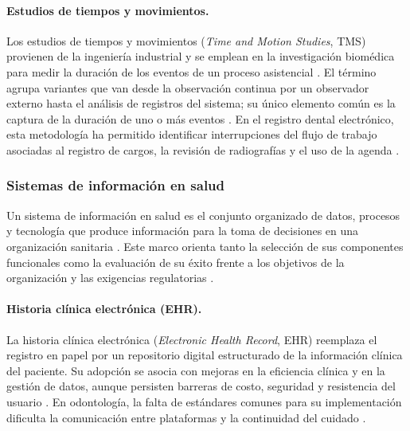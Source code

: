 \paragraph{Estudios de tiempos y movimientos.}

Los estudios de tiempos y movimientos (\textit{Time and Motion Studies}, TMS)
provienen de la ingeniería industrial y se emplean en la investigación biomédica para
medir la duración de los eventos de un proceso asistencial \cite{cureus2022purpose}.
El término agrupa variantes que van desde la observación continua por un observador
externo hasta el análisis de registros del sistema; su único elemento común es la
captura de la duración de uno o más eventos \cite{Lopetegui2014TMS}. En el registro
dental electrónico, esta metodología ha permitido identificar interrupciones del flujo
de trabajo asociadas al registro de cargos, la revisión de radiografías y el uso de la
agenda \cite{schwei2016exploring}.

\subsubsection{Sistemas de información en salud}

Un sistema de información en salud es el conjunto organizado de datos, procesos y
tecnología que produce información para la toma de decisiones en una organización
sanitaria \cite{sciencedirect2024his}. Este marco orienta tanto la selección de sus
componentes funcionales como la evaluación de su éxito frente a los objetivos de la
organización y las exigencias regulatorias \cite{ovreiu2024empowering}.

\paragraph{Historia clínica electrónica (EHR).}

La historia clínica electrónica (\textit{Electronic Health Record}, EHR) reemplaza el
registro en papel por un repositorio digital estructurado de la información clínica
del paciente. Su adopción se asocia con mejoras en la eficiencia clínica y en la
gestión de datos, aunque persisten barreras de costo, seguridad y resistencia del
usuario \cite{sravya2024electronic}. En odontología, la falta de estándares comunes
para su implementación dificulta la comunicación entre plataformas y la continuidad
del cuidado \cite{gurupur2024standards}.

